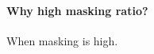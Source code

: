 \documentclass[preprint,5p]{elsarticle}
\newcommand\eatpunct[1]{}
\begin{document}
\paragraph[]{Why high masking ratio? \eatpunct}
When masking is high.
\end{document}
